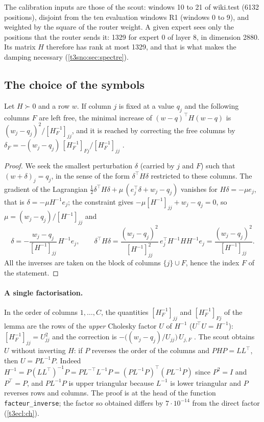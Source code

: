 The calibration inputs are those of the scout: windows 10 to 21 of wiki.test (\num{6132} positions), disjoint from the ten evaluation windows R1 (windows 0 to 9), and weighted by the square of the router weight. A given expert sees only the positions that the router sends it: \num{1329} for expert 0 of layer 8, in dimension \num{2880}. Its matrix $H$ therefore has rank at most \num{1329}, and that is what makes the damping necessary (\cref{t3sno:sec:spectre}).

\subsection{The choice of the symbols}\label{t3sno:sec:choix}

\begin{lemme}\label{t3sno:lem:obs}
Let $H \succ 0$ and a row $w$. If column $j$ is fixed at a value $q_j$ and the following columns $F$ are left free, the minimal increase of $(w - q)^\top H (w - q)$ is $(w_j - q_j)^2 / [H_F^{-1}]_{jj}$, and it is reached by correcting the free columns by $\delta_F = -(w_j - q_j)\,[H_F^{-1}]_{F j} / [H_F^{-1}]_{jj}$ \parencite{hassibi1992obs,frantar2022obc}.
\end{lemme}
\begin{proof}
We seek the smallest perturbation $\delta$ (carried by $j$ and $F$) such that $(w + \delta)_j = q_j$, in the sense of the form $\delta^\top H \delta$ restricted to these columns. The gradient of the Lagrangian $\tfrac12 \delta^\top H \delta + \mu\,(e_j^\top \delta + w_j - q_j)$ vanishes for $H\delta = -\mu e_j$, that is $\delta = -\mu H^{-1} e_j$; the constraint gives $-\mu [H^{-1}]_{jj} + w_j - q_j = 0$, so $\mu = (w_j - q_j)/[H^{-1}]_{jj}$ and
\[
\delta = -\frac{w_j - q_j}{[H^{-1}]_{jj}}\, H^{-1} e_j,\qquad
\delta^\top H \delta = \frac{(w_j - q_j)^2}{[H^{-1}]_{jj}^2}\, e_j^\top H^{-1} H H^{-1} e_j = \frac{(w_j - q_j)^2}{[H^{-1}]_{jj}} .
\]
All the inverses are taken on the block of columns $\{j\} \cup F$, hence the index $F$ of the statement.
\end{proof}

\paragraph{A single factorisation.} In the order of columns $1, \dots, C$, the quantities $[H_F^{-1}]_{jj}$ and $[H_F^{-1}]_{Fj}$ of the lemma are the rows of the \emph{upper} Cholesky factor $U$ of $H^{-1}$ ($U^\top U = H^{-1}$): $[H_F^{-1}]_{jj} = U_{jj}^2$ and the correction is $-\bigl((w_j - q_j)/U_{jj}\bigr)\, U_{j,F}$ \parencite{frantar2022gptq}. The scout obtains $U$ without inverting $H$: if $P$ reverses the order of the columns and $P H P = L L^\top$, then $U = P L^{-1} P$. Indeed $H^{-1} = P (L L^\top)^{-1} P = P L^{-\top} L^{-1} P = (P L^{-1} P)^\top (P L^{-1} P)$ since $P^2 = I$ and $P^\top = P$, and $P L^{-1} P$ is upper triangular because $L^{-1}$ is lower triangular and $P$ reverses rows and columns. The proof is at the head of the function \texttt{facteur\_inverse}; the factor so obtained differs by $7 \cdot 10^{-14}$ from the direct factor (\cref{t3ecl:ch}).


